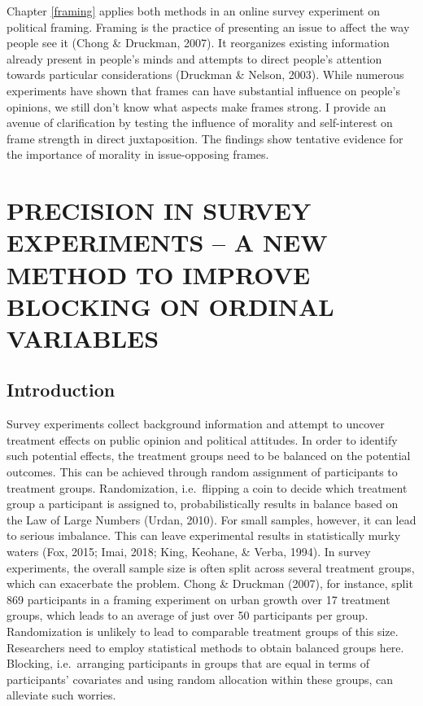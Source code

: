 \documentclass[12pt,econ]{sources/authesis}
\begin{document}
Chapter \ref{framing} applies both methods in an online survey experiment on political framing. Framing is the practice of presenting an issue to affect the way people see it (Chong \& Druckman, 2007). It reorganizes existing information already present in people's minds and attempts to direct people's attention towards particular considerations (Druckman \& Nelson, 2003). While numerous experiments have shown that frames can have substantial influence on people's opinions, we still don't know what aspects make frames strong. I provide an avenue of clarification by testing the influence of morality and self-interest on frame strength in direct juxtaposition. The findings show tentative evidence for the importance of morality in issue-opposing frames.

\hypertarget{ordblock}{%
\chapter{PRECISION IN SURVEY EXPERIMENTS -- A NEW METHOD TO IMPROVE BLOCKING ON ORDINAL VARIABLES}\label{ordblock}}

\hypertarget{ordblock-intro}{%
\section{Introduction}\label{ordblock-intro}}

Survey experiments collect background information and attempt to uncover treatment effects on public opinion and political attitudes. In order to identify such potential effects, the treatment groups need to be balanced on the potential outcomes. This can be achieved through random assignment of participants to treatment groups. Randomization, i.e.~flipping a coin to decide which treatment group a participant is assigned to, probabilistically results in balance based on the Law of Large Numbers (Urdan, 2010). For small samples, however, it can lead to serious imbalance. This can leave experimental results in statistically murky waters (Fox, 2015; Imai, 2018; King, Keohane, \& Verba, 1994). In survey experiments, the overall sample size is often split across several treatment groups, which can exacerbate the problem. Chong \& Druckman (2007), for instance, split 869 participants in a framing experiment on urban growth over 17 treatment groups, which leads to an average of just over 50 participants per group. Randomization is unlikely to lead to comparable treatment groups of this size. Researchers need to employ statistical methods to obtain balanced groups here. Blocking, i.e.~arranging participants in groups that are equal in terms of participants' covariates and using random allocation within these groups, can alleviate such worries.
\end{document}
